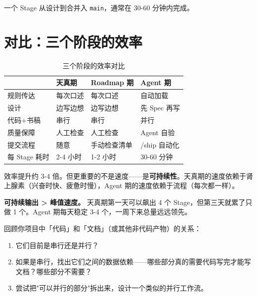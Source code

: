一个 Stage 从设计到合并入 \texttt{main}，通常在 30-60 分钟内完成。

\section{对比：三个阶段的效率}

\begin{table}[H]
\centering
\begin{tabular}{llll}
\toprule
& \textbf{天真期} & \textbf{Roadmap 期} & \textbf{Agent 期} \\
\midrule
规则传达 & 每次口述 & 每次口述 & 自动加载 \\
设计 & 边写边想 & 边写边想 & 先 Spec 再写 \\
代码+书稿 & 串行 & 串行 & 并行 \\
质量保障 & 人工检查 & 人工检查 & Agent 自验 \\
提交流程 & 随意 & 手动检查清单 & /ship 自动化 \\
\midrule
每 Stage 耗时 & 2-4 小时 & 1-2 小时 & 30-60 分钟 \\
\bottomrule
\end{tabular}
\caption{三个阶段的效率对比}
\end{table}

效率提升约 3-4 倍。但更重要的不是速度——是\textbf{可持续性}。天真期的速度依赖于肾上腺素（兴奋时快、疲惫时慢），Agent 期的速度依赖于流程（每次都一样）。

\begin{lessonbox}
\textbf{可持续输出 > 峰值速度。} 天真期第一天可以飙出 4 个 Stage，但第三天就累了只做 1 个。Agent 期每天稳定 3-4 个，一周下来总量远远领先。
\end{lessonbox}

\begin{exercise}
回顾你项目中「代码」和「文档」（或其他非代码产物）的关系：
\begin{enumerate}
  \item 它们目前是串行还是并行？
  \item 如果是串行，找出它们之间的数据依赖——哪些部分真的需要代码写完才能写文档？哪些部分不需要？
  \item 尝试把"可以并行的部分"拆出来，设计一个类似的并行工作流。
\end{enumerate}
\end{exercise}
